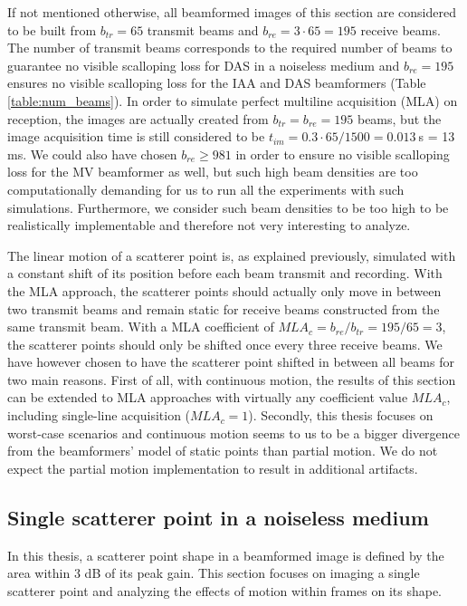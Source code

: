 If not mentioned otherwise, all beamformed images of this section are considered to be built from $b_{tr} = 65$ transmit beams and $b_{re} = 3 \cdot 65 = 195$ receive beams. The number of transmit beams corresponds to the required number of beams to guarantee no visible scalloping loss for DAS in a noiseless medium and $b_{re} = 195$ ensures no visible scalloping loss for the IAA and DAS beamformers (Table \ref{table:num_beams}).
In order to simulate perfect multiline acquisition (MLA) on reception, the images are actually created from $b_{tr} = b_{re} = 195$ beams, but the image acquisition time is still considered to be $t_{im} = 0.3 \cdot 65 / 1500 = 0.013~$s = 13 ms.
We could also have chosen $b_{re} \geq 981$ in order to ensure no visible scalloping loss for the MV beamformer as well, but 
such high beam densities are too computationally demanding for us to run all the experiments with such simulations.
Furthermore, we consider such beam densities to be too high to be realistically implementable and therefore not very interesting to analyze.

The linear motion of a scatterer point is, as explained previously, simulated with a constant shift of its position before each beam transmit and recording. With the MLA approach, the scatterer points should actually only move in between two transmit beams and remain static for receive beams constructed from the same transmit beam. With a MLA coefficient of $MLA_c = b_{re} / b_{tr} = 195 / 65 = 3$, the scatterer points should only be shifted once every three receive beams.
We have however chosen to have the scatterer point shifted in between all beams for two main reasons.
First of all, with continuous motion, the results of this section can be extended to MLA approaches with virtually any coefficient value $MLA_c$, including single-line acquisition ($MLA_c = 1$). Secondly, this thesis focuses on worst-case scenarios and continuous motion seems to us to be a bigger divergence from the beamformers' model of static points than partial motion. We do not expect the partial motion implementation to result in additional artifacts.


\subsection{Single scatterer point in a noiseless medium}
\label{sec:single_noiseless}
In this thesis, a scatterer point shape in a beamformed image is defined by the area within 3 dB of its peak gain. This section focuses on imaging a single scatterer point and analyzing the effects of motion within frames on its shape.

